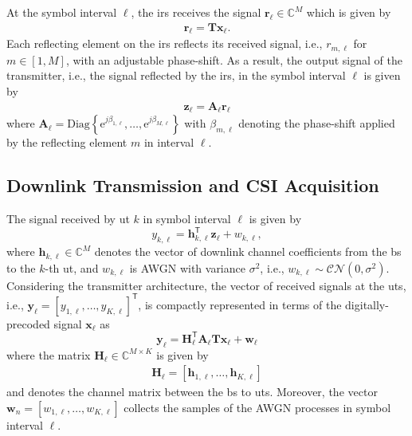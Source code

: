 \documentclass[12pt,draftclsnofoot,onecolumn,journal]{IEEEtran}
\newcommand{\brc}[1]{ \left( #1 \right) }
\newcommand{\dbc}[1]{ \left[ #1 \right] }
\newcommand{\Diag}[1]{ \mathrm{Diag}\left\lbrace #1 \right\rbrace }
\newcommand{\e}{\mathrm{e}}
\newcommand{\trp}{\mathsf{T}}
\begin{document}
At the symbol interval $\ell$, the \ac{irs} receives the signal $\mathbf{r}_\ell \in \mathbb C^{M}$ which is given by
\begin{align}
	\mathbf{r}_\ell = \mathbf{T} \mathbf{x}_\ell.
\end{align}
Each reflecting element on the  \ac{irs} reflects its received signal, i.e., $r_{m,\ell}$ for $m\in \dbc{1, M}$, with an adjustable phase-shift. As a result, the output signal of the transmitter, i.e., the signal reflected by the \ac{irs}, in the symbol interval $\ell$ is given by
\begin{align}
	\mathbf{z}_\ell = \mathbf{A}_\ell \mathbf{r}_\ell
\end{align}
where $\mathbf{A}_\ell = \Diag{ \e^{j\beta_{1,\ell}} , \ldots, \e^{j\beta_{M,\ell}} }$ with $\beta_{m,\ell}$ denoting the phase-shift applied by the reflecting element $m$ in interval $\ell$.

\subsection{Downlink Transmission and CSI Acquisition}
The signal received by \ac{ut} $k$ in symbol interval $\ell$ is given by
\begin{equation}
y_{k,\ell} =\mathbf{h}_{k,\ell}^{\mathsf{T}} \mathbf{z}_\ell+ w_{k,\ell},
\end{equation}
where $\mathbf{h}_{k, \ell} \in \mathbb{C}^{M}$ denotes the vector of downlink channel coefficients from the \ac{bs} to the $k$-th \ac{ut}, and $w_{k,\ell}$ is \ac{AWGN} with variance $\sigma^2$, i.e., $w_{k,\ell}\sim\mathcal{CN} \brc{ 0, \sigma^2}$. Considering the transmitter architecture, the vector of received signals at the \acp{ut}, i.e., $\mathbf{y}_\ell = \dbc{y_{1,\ell}, \ldots, y_{K,\ell}}^{\mathsf T}$, is compactly represented in terms of the digitally-precoded signal $\mathbf{x}_\ell$ as
\begin{equation}
\mathbf{y}_{\ell} =\mathbf{H}_\ell^\trp \mathbf A_\ell \mathbf T \mathbf{x}_\ell + \mathbf{w}_{\ell}
\end{equation}
where the matrix $\mathbf{H}_\ell \in \mathbb{C}^{M\times K}$ is given by
\begin{align}
	\mathbf{H}_\ell = \dbc{ \mathbf{h}_{1,\ell} , \ldots, \mathbf{h}_{K,\ell} }
\end{align}
and denotes the channel matrix between the \ac{bs} to \acp{ut}. Moreover, the vector $\mathbf{w}_{n} = \dbc{w_{1,\ell}, \ldots, w_{K,\ell}}$ collects the samples of the \ac{AWGN} processes in symbol interval $\ell$. 
\end{document}
